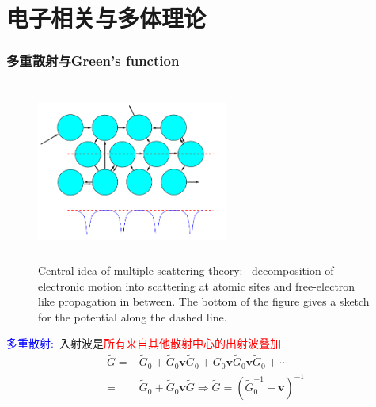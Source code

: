 \section{电子相关与多体理论}
\frame
{
	\frametitle{多重散射与\textrm{Green's function}}
\begin{figure}[h!]
	\vspace{-0.55in}
\centering
\includegraphics[height=2.32in,width=2.48in,viewport=5 0 515 475,clip]{Figures/multiple-scattering_theory.png}
\caption{\tiny \textrm{Central idea of multiple scattering theory:~ decomposition of electronic motion into scattering at atomic sites and free-electron like propagation in between. The bottom of the figure gives a sketch for the potential along the dashed line.}}
\label{Multi-scattering}
\end{figure}
\textcolor{blue}{多重散射:~}入射波是\textcolor{red}{所有来自其他散射中心的出射波叠加}
			\begin{displaymath}
				\begin{aligned}
					\tilde G=&\tilde G_0+\tilde G_0\mathbf{v}\tilde G_0+G_0\mathbf{v}\tilde G_0\mathbf{v}\tilde G_0+\cdots\\
					=&\tilde G_0+\tilde G_0\mathbf{v}\tilde G \Longrightarrow \tilde G=(\tilde G_0^{-1}-\mathbf{v})^{-1}
				\end{aligned}
			\end{displaymath}
}

